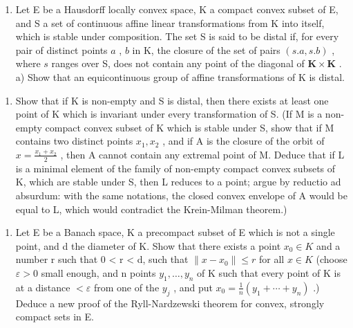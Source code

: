\exerciseappendix

\begin{enumerate}
\def\labelenumi{\arabic{enumi})}
\tightlist
\item
  Let E be a Hausdorff locally convex space, K a compact convex subset of E, and S a set of continuous affine linear transformations from K into itself, which is stable under composition. The set S is said to be distal if, for every pair of distinct points \(a\) , \(b\) in K, the closure of the set of pairs \((s.a,s.b)\) , where \(s\) ranges over S, does not contain any point of the diagonal of \(\mathbf{K} \times \mathbf{K}\) . a) Show that an equicontinuous group of affine transformations of K is distal.
\end{enumerate}

\begin{enumerate}
\def\labelenumi{\alph{enumi})}
\setcounter{enumi}{1}
\tightlist
\item
  Show that if K is non-empty and S is distal, then there exists at least one point of K which is invariant under every transformation of S. (If M is a non-empty compact convex subset of K which is stable under S, show that if M contains two distinct points \(x_{1}, x_{2}\) , and if A is the closure of the orbit of \(x = \frac{x_{1} + x_{2}}{2}\) , then A cannot contain any extremal point of M. Deduce that if L is a minimal element of the family of non-empty compact convex subsets of K, which are stable under S, then L reduces to a point; argue by reductio ad absurdum: with the same notations, the closed convex envelope of A would be equal to L, which would contradict the Krein-Milman theorem.)
\end{enumerate}

\begin{enumerate}
\def\labelenumi{\arabic{enumi})}
\setcounter{enumi}{1}
\tightlist
\item
  Let E be a Banach space, K a precompact subset of E which is not a single point, and d the diameter of K. Show that there exists a point \(x_{0} \in K\) and a number r such that 0 \textless{} r \textless{} d, such that \(\|x - x_{0}\| \leqslant r\) for all \(x \in K\) (choose \(\varepsilon > 0\) small enough, and n points \(y_{1}, \ldots, y_{n}\) of K such that every point of K is at a distance \(<\varepsilon\) from one of the \(y_{j}\) , and put \(x_{0} = \frac{1}{n}(y_{1} + \cdots + y_{n})\) .) Deduce a new proof of the Ryll-Nardzewski theorem for convex, strongly compact sets in E.
\end{enumerate}

